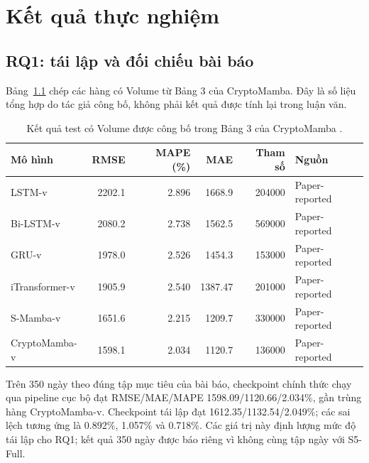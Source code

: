 \documentclass[13pt,a4paper,oneside]{report}
\begin{document}
\chapter{Kết quả thực nghiệm}\label{chap:results}

\section{RQ1: tái lập và đối chiếu bài báo}\label{sec:rq1-results}
Bảng~\ref{tab:paper-forecast} chép các hàng có Volume từ Bảng 3 của CryptoMamba. Đây là số liệu tổng
hợp do tác giả công bố, không phải kết quả được tính lại trong luận văn.

\begin{table}[htbp]
\centering
\caption{Kết quả test có Volume được công bố trong Bảng 3 của CryptoMamba
\cite{cryptomamba}.}
\label{tab:paper-forecast}
{\small
\begin{tabularx}{\linewidth}{@{}Xrrrrl@{}}
\toprule
\textbf{Mô hình} & \textbf{RMSE} & \textbf{MAPE (\%)} & \textbf{MAE} & \textbf{Tham số} & \textbf{Nguồn} \\
\midrule
LSTM-v & \num{2202.1} & \num{2.896} & \num{1668.9} & \num{204000} & Paper-reported \\
Bi-LSTM-v & \num{2080.2} & \num{2.738} & \num{1562.5} & \num{569000} & Paper-reported \\
GRU-v & \num{1978.0} & \num{2.526} & \num{1454.3} & \num{153000} & Paper-reported \\
iTransformer-v & \num{1905.9} & \num{2.540} & \num{1387.47} & \num{201000} & Paper-reported \\
S-Mamba-v & \num{1651.6} & \num{2.215} & \num{1209.7} & \num{330000} & Paper-reported \\
CryptoMamba-v & \num{1598.1} & \num{2.034} & \num{1120.7} & \num{136000} & Paper-reported \\
\bottomrule
\end{tabularx}}
\end{table}

Trên 350 ngày theo đúng tập mục tiêu của bài báo, checkpoint chính thức chạy qua pipeline cục bộ đạt
RMSE/MAE/MAPE \num{1598.09}/\num{1120.66}/\num{2.034}\%, gần trùng hàng CryptoMamba-v. Checkpoint
tái lập đạt \num{1612.35}/\num{1132.54}/\num{2.049}\%; các sai lệch tương ứng là
\num{0.892}\%, \num{1.057}\% và \num{0.718}\%. Các giá trị này định lượng mức độ tái lập cho RQ1;
kết quả 350 ngày được báo riêng vì không cùng tập ngày với S5-Full.
\end{document}
